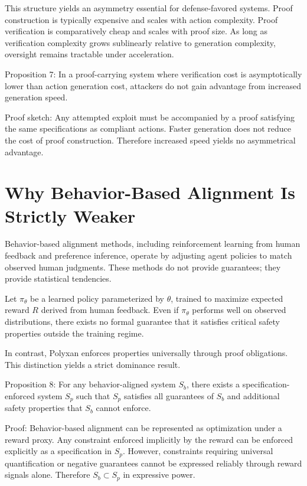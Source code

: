 \documentclass[11pt,oneside]{article}
\begin{document}
This structure yields an asymmetry essential for defense-favored systems. Proof construction is typically expensive and scales with action complexity. Proof verification is comparatively cheap and scales with proof size. As long as verification complexity grows sublinearly relative to generation complexity, oversight remains tractable under acceleration.

Proposition 7: In a proof-carrying system where verification cost is asymptotically lower than action generation cost, attackers do not gain advantage from increased generation speed.

Proof sketch: Any attempted exploit must be accompanied by a proof satisfying the same specifications as compliant actions. Faster generation does not reduce the cost of proof construction. Therefore increased speed yields no asymmetrical advantage.

\section{Why Behavior-Based Alignment Is Strictly Weaker}

Behavior-based alignment methods, including reinforcement learning from human feedback and preference inference, operate by adjusting agent policies to match observed human judgments. These methods do not provide guarantees; they provide statistical tendencies.

Let \( \pi_\theta \) be a learned policy parameterized by \( \theta \), trained to maximize expected reward \( R \) derived from human feedback. Even if \( \pi_\theta \) performs well on observed distributions, there exists no formal guarantee that it satisfies critical safety properties outside the training regime.

In contrast, Polyxan enforces properties universally through proof obligations. This distinction yields a strict dominance result.

Proposition 8: For any behavior-aligned system \( S_b \), there exists a specification-enforced system \( S_p \) such that \( S_p \) satisfies all guarantees of \( S_b \) and additional safety properties that \( S_b \) cannot enforce.

Proof: Behavior-based alignment can be represented as optimization under a reward proxy. Any constraint enforced implicitly by the reward can be enforced explicitly as a specification in \( S_p \). However, constraints requiring universal quantification or negative guarantees cannot be expressed reliably through reward signals alone. Therefore \( S_b \subset S_p \) in expressive power.
\end{document}
